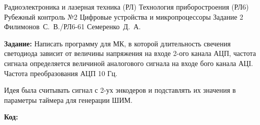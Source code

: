 \documentclass{bmstu}
\begin{document}
	\makereporttitle
	{Радиоэлектроника и лазерная техника (РЛ)} %
	{Технология приборостроения (РЛ6)} %
	{Рубежный контроль №2} %
	{Цифровые устройства и микропроцессоры} %
	{Задание 2} %
	{} %
	{Филимонов~С.~В./РЛ6-61} %
	{Семеренко~Д.~А.} %
	
	\textbf{Задание:} Написать программу для МК, в которой длительность свечения светодиода зависит от величины напряжения на входе
	2-ого канала АЦП, частота сигнала определяется величиной аналогового сигнала на входе бого канала АЦІ. Частота преобразования АЦП 10 Гц.
	
	Идея была считывать сигнал с 2-ух энкодеров и подставлять их значения в параметры таймера для генерации ШИМ.
	
	\textbf{Код:}
	
\end{document}
